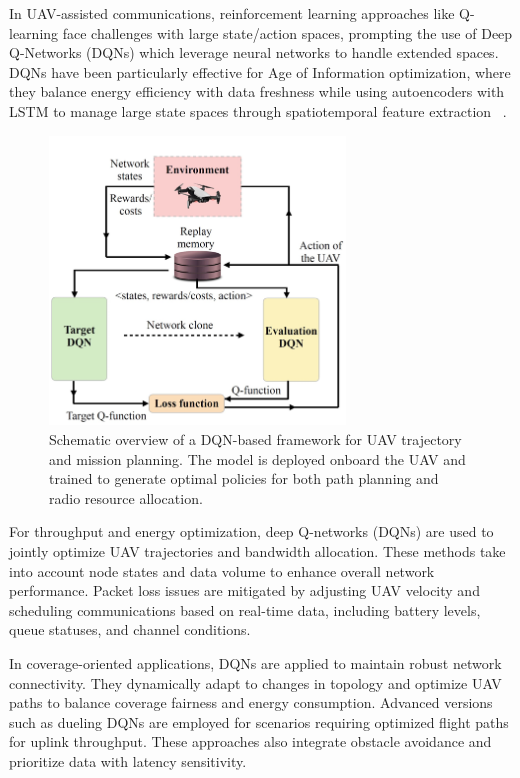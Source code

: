 In UAV-assisted communications, reinforcement learning approaches like Q-learning face challenges with large state/action spaces, prompting the use of Deep Q-Networks (DQNs) which leverage neural networks to handle extended spaces. DQNs have been particularly effective for Age of Information optimization, where they balance energy efficiency with data freshness while using autoencoders with LSTM to manage large state spaces through spatiotemporal feature extraction ~\cite{abedin2020data,ferdowsi2021neural}.


\begin{figure}[H]
\centering
\includegraphics[width=0.7\textwidth]{Figures/Chapter2/Section1/2.png}
\caption{ Schematic overview of a DQN-based framework for UAV trajectory and mission planning. The model is deployed onboard the UAV and trained to generate optimal policies for both path planning and radio resource allocation. \cite{kurunathan2022machine}}
\label{fig:dqn_trajectory_planning}
\end{figure}



For throughput and energy optimization, deep Q-networks (DQNs) are used to jointly optimize UAV trajectories and bandwidth allocation. These methods take into account node states and data volume to enhance overall network performance. Packet loss issues are mitigated by adjusting UAV velocity and scheduling communications based on real-time data, including battery levels, queue statuses, and channel conditions.

In coverage-oriented applications, DQNs are applied to maintain robust network connectivity. They dynamically adapt to changes in topology and optimize UAV paths to balance coverage fairness and energy consumption. Advanced versions such as dueling DQNs are employed for scenarios requiring optimized flight paths for uplink throughput. These approaches also integrate obstacle avoidance and prioritize data with latency sensitivity.

